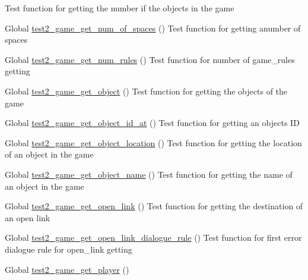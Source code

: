 \begin{DoxyRefList}
%
Test function for getting the number if the objects in the game  
\item[Global \mbox{\hyperlink{game__test_8c_a786e827d5128cec7564ff9e00040bfe6}{test2\+\_\+game\+\_\+get\+\_\+num\+\_\+of\+\_\+spaces}} ()]\label{test__test000222}%
%
Test function for getting anumber of spaces  
\item[Global \mbox{\hyperlink{game__test_8c_a7bf582f49520c85b723964e68b84e156}{test2\+\_\+game\+\_\+get\+\_\+num\+\_\+rules}} ()]\label{test__test000407}%
%
Test function for number of game\+\_\+rules getting  
\item[Global \mbox{\hyperlink{game__test_8c_a967cc4c5f6555e32a3c9e4dcb924c65f}{test2\+\_\+game\+\_\+get\+\_\+object}} ()]\label{test__test000185}%
%
Test function for getting the objects of the game  
\item[Global \mbox{\hyperlink{game__test_8c_a1ade7bd0ab14f9a2b430fd50e91b636c}{test2\+\_\+game\+\_\+get\+\_\+object\+\_\+id\+\_\+at}} ()]\label{test__test000194}%
%
Test function for getting an object\textquotesingle{}s ID  
\item[Global \mbox{\hyperlink{game__test_8c_a635a940244bbb00d432a6accee598c20}{test2\+\_\+game\+\_\+get\+\_\+object\+\_\+location}} ()]\label{test__test000203}%
%
Test function for getting the location of an object in the game  
\item[Global \mbox{\hyperlink{game__test_8c_ada84e0a88c478a84b17f7a38d0d5ace6}{test2\+\_\+game\+\_\+get\+\_\+object\+\_\+name}} ()]\label{test__test000199}%
%
Test function for getting the name of an object in the game  
\item[Global \mbox{\hyperlink{game__test_8c_ad905f72b99609c9258cd29b29d07acf5}{test2\+\_\+game\+\_\+get\+\_\+open\+\_\+link}} ()]\label{test__test000262}%
%
Test function for getting the destination of an open link  
\item[Global \mbox{\hyperlink{game__test_8c_a043e5d432343ff854bee522a7e3e4789}{test2\+\_\+game\+\_\+get\+\_\+open\+\_\+link\+\_\+dialogue\+\_\+rule}} ()]\label{test__test000368}%
%
Test function for first error dialogue rule for open\+\_\+link getting  
\item[Global \mbox{\hyperlink{game__test_8c_a8a8b3634c39499b44a9211f8f1bf06ba}{test2\+\_\+game\+\_\+get\+\_\+player}} ()]\label{test__test000152}%

\end{DoxyRefList}
